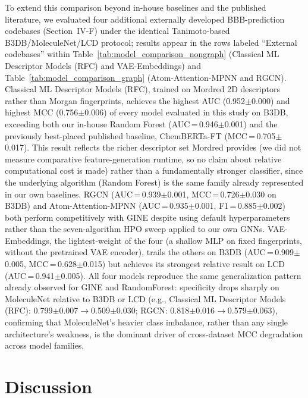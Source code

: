 \documentclass[conference]{IEEEtran}
\begin{document}
To extend this comparison beyond in-house baselines and the published
literature, we evaluated four additional externally developed
BBB-prediction codebases (Section~IV-F) under the identical
Tanimoto-based B3DB/MoleculeNet/LCD protocol; results appear in the
rows labeled ``External codebases'' within
Table~\ref{tab:model_comparison_nongraph} (Classical ML Descriptor
Models (RFC) and VAE-Embeddings) and
Table~\ref{tab:model_comparison_graph} (Atom-Attention-MPNN and RGCN). Classical ML Descriptor Models
(RFC), trained on Mordred 2D descriptors rather than Morgan
fingerprints, achieves the highest AUC (0.952$\pm$0.000) and highest MCC
(0.756$\pm$0.006) of every model evaluated in this study on B3DB, exceeding
both our in-house Random Forest (AUC\,=\,0.946$\pm$0.001) and the previously
best-placed published baseline, ChemBERTa-FT (MCC\,=\,0.705$\pm$0.017). This
result reflects the richer descriptor
set Mordred provides (we did not measure comparative feature-generation
runtime, so no claim about relative computational cost is made) rather
than a fundamentally stronger classifier,
since the underlying algorithm (Random Forest) is the same family
already represented in our own baselines. RGCN (AUC\,=\,0.939$\pm$0.001,
MCC\,=\,0.726$\pm$0.030 on B3DB) and Atom-Attention-MPNN (AUC\,=\,0.935$\pm$0.001,
F1\,=\,0.885$\pm$0.002) both perform competitively with GINE despite using default
hyperparameters rather than the seven-algorithm HPO sweep applied to
our own GNNs. VAE-Embeddings, the lightest-weight of the four (a
shallow MLP on fixed fingerprints, without the pretrained VAE encoder),
trails the others on B3DB (AUC\,=\,0.909$\pm$0.005, MCC\,=\,0.628$\pm$0.015) but achieves
its strongest relative result on LCD (AUC\,=\,0.941$\pm$0.005). All four
models reproduce the same generalization pattern already observed for
GINE and RandomForest: specificity drops sharply on MoleculeNet relative
to B3DB or LCD (e.g., Classical ML Descriptor Models (RFC): 0.799$\pm$0.007$\to$0.509$\pm$0.030; RGCN:
0.818$\pm$0.016$\to$0.579$\pm$0.063), confirming that MoleculeNet's heavier class
imbalance, rather than any single architecture's weakness, is the
dominant driver of cross-dataset MCC degradation across model
families.

\section{Discussion}
\end{document}
